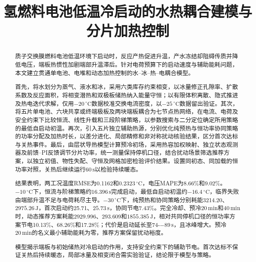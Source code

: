 \documentclass[bwprint]{gmcmthesis}
\title{氢燃料电池低温冷启动的水热耦合建模与分片加热控制}
\numberwithin{equation}{section}
\numberwithin{figure}{section}
\begin{document}
 \maketitle
 \begin{abstract}
质子交换膜燃料电池低温环境下启动时，反应产热促进升温，产水冻结却阻碍传质并降低电压，端板热惯性加剧端部升温滞后。针对电荷预算下的启动速度与辅助能耗问题，本文建立贯通单电池、电堆和动态加热控制的水--冰--热--电耦合模型。

首先，将水划分为蒸气、液水和冰，采用六类库存约束相变，以冰量修正孔隙率、扩散系数及反应面积，将相变潜热和双极板储热纳入能量守恒；以有限体积离散、隐式推进及热电迭代求解，仅用$-20\,^\circ\mathrm C$数据校准交换电流密度，以$-25\,^\circ\mathrm C$数据留出验证。其次，将五片单电池、六块共享或终端极板及两块端板耦合为七节点热网络，在电流、电荷及安全约束下比较恒流、线性升载和三段阶梯策略，以参数搜索与二分定位确定所用策略的最低自启动初温。再次，引入五片独立辅助热源，分别优化纯预热与恒功率协同策略的功率分配及加热时长，以差分进化、局部精修和非对称扰动核验结果，区分首次达标与关热事件。最后，由层状导热模型计算预冷初场，采用热容加权映射、独立状态观测器及前馈--PI反馈调节分片功率，统一测量保持停机口径，结合扰动场景筛选推荐方案，以独立初值、物性失配、守恒及网格加密检验评价结果。设置同初态、同加载的恒功率对照，关热后继续运行$60\,\mathrm{s}$以检验持续暖态。

结果表明，两工况温度RMSE为0.1162和$0.2323\,^\circ\mathrm C$，电压MAPE为8.66\%和9.02\%。$-10\,^\circ\mathrm C$下，恒流与阶梯策略约$16.396\,\mathrm{s}$完成启动，最低自启动初温约$-16.4\,^\circ\mathrm C$，临界失败由端部升温不足与电荷耗尽主导。$-30\,^\circ\mathrm C$下，纯预热和协同策略分别耗能3214.20、$2975.26\,\mathrm{J}$，首次启动约25.71、$25.73\,\mathrm{s}$，协同节电7.43\%。完全冷却、预冷$20\,\mathrm{min}$和$40\,\mathrm{min}$时，动态推荐方案耗能2929.996、293.609和$1855.385\,\mathrm{J}$，相对共同停机口径的恒功率方案节电10.13\%、68.26\%和17.28\%；代价是启动延长至74-$-89\,\mathrm{s}$，且冰峰增大。预冷$20\,\mathrm{min}$的名义最小辅助能耗为零，推荐方案保留扰动裕度。

模型揭示端板与初始储热对冷启动的作用，支持安全约束下的辅助节电。首次达标不保证关热后持续暖态，局部冰量及相变闭合需实验验证，结论限于模型与策略。
\end{abstract}


\setcounter{tocdepth}{2}
\tableofcontents

\clearpage
\end{document}
